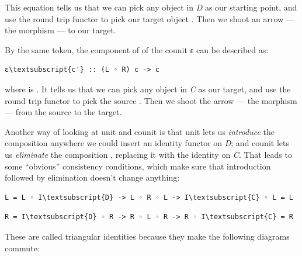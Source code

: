 This equation tells us that we can pick any object  in
\emph{D} as our starting point, and use the round trip functor
 to pick our target object . Then we
shoot an arrow --- the morphism  --- to our target.

\begin{figure}[H]
\centering
{}
\end{figure}

\noindent
By the same token, the component of of the counit ε can be described as:

\begin{Verbatim}[commandchars=\\\{\}]
ε\textsubscript{c'} :: (L ◦ R) c -> c
\end{Verbatim}
where  is . It tells us that we
can pick any object  in \emph{C} as our target, and use the
round trip functor  to pick the source
. Then we shoot the arrow --- the morphism
 --- from the source to the target.

Another way of looking at unit and counit is that unit lets us
\emph{introduce} the composition  anywhere we could
insert an identity functor on \emph{D}; and counit lets us
\emph{eliminate} the composition , replacing it with the
identity on \emph{C}. That leads to some ``obvious'' consistency
conditions, which make sure that introduction followed by elimination
doesn't change anything:

\begin{Verbatim}[commandchars=\\\{\}]
L = L ◦ I\textsubscript{D} -> L ◦ R ◦ L -> I\textsubscript{C} ◦ L = L
\end{Verbatim}

\begin{Verbatim}[commandchars=\\\{\}]
R = I\textsubscript{D} ◦ R -> R ◦ L ◦ R -> R ◦ I\textsubscript{C} = R
\end{Verbatim}
These are called triangular identities because they make the following
diagrams commute:

